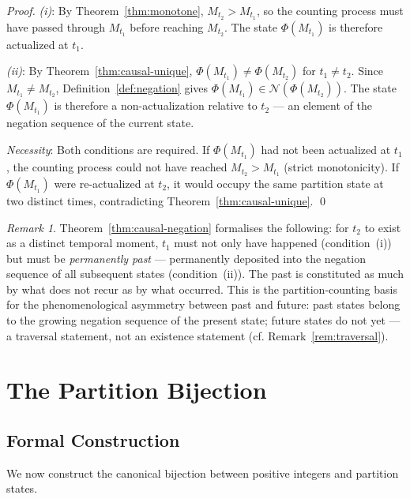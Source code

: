\documentclass[twocolumn,10pt,a4paper]{article}
\theoremstyle{thmstyle}
\theoremstyle{definition}
\theoremstyle{remark}
\newtheorem{remark}[theorem]{Remark}
\newcommand{\PhiMap}{\varPhi}
\begin{document}
\begin{proof}
\textit{(i)}: By Theorem~\ref{thm:monotone}, $M_{t_2} > M_{t_1}$, so the counting process must have passed through $M_{t_1}$ before reaching $M_{t_2}$. The state $\PhiMap(M_{t_1})$ is therefore actualized at $t_1$.

\textit{(ii)}: By Theorem~\ref{thm:causal-unique}, $\PhiMap(M_{t_1}) \neq \PhiMap(M_{t_2})$ for $t_1 \neq t_2$. Since $M_{t_1} \neq M_{t_2}$, Definition~\ref{def:negation} gives $\PhiMap(M_{t_1}) \in \mathcal{N}(\PhiMap(M_{t_2}))$. The state $\PhiMap(M_{t_1})$ is therefore a non-actualization relative to $t_2$ --- an element of the negation sequence of the current state.

\textit{Necessity}: Both conditions are required. If $\PhiMap(M_{t_1})$ had not been actualized at $t_1$, the counting process could not have reached $M_{t_2} > M_{t_1}$ (strict monotonicity). If $\PhiMap(M_{t_1})$ were re-actualized at $t_2$, it would occupy the same partition state at two distinct times, contradicting Theorem~\ref{thm:causal-unique}. \qed
\end{proof}

\begin{remark}
Theorem~\ref{thm:causal-negation} formalises the following: for $t_2$ to exist as a distinct temporal moment, $t_1$ must not only have happened (condition~(i)) but must be \emph{permanently past} --- permanently deposited into the negation sequence of all subsequent states (condition~(ii)). The past is constituted as much by what does not recur as by what occurred. This is the partition-counting basis for the phenomenological asymmetry between past and future: past states belong to the growing negation sequence of the present state; future states do not yet --- a traversal statement, not an existence statement (cf. Remark~\ref{rem:traversal}).
\end{remark}

\section{The Partition Bijection}
\label{sec:bijection}

\subsection{Formal Construction}

We now construct the canonical bijection between positive integers and partition states.
\end{document}
